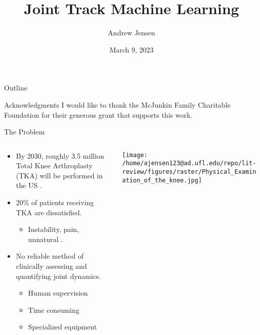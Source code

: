 \documentclass[presentation, aspectratio=1610]{beamer}
\author{Andrew Jensen}
\date{March 9, 2023}
\title{Joint Track Machine Learning}
\begin{document}
\maketitle
\begin{frame}{Outline}
\tableofcontents
\end{frame}

\begin{frame}[label={sec:org9eecd50},standout]{Acknowledgments}
I would like to thank the McJunkin Family Charitable Foundation for their generous grant that supports this work.
\end{frame}
\begin{frame}[label={sec:org2b7cb7e}]{The Problem}
\begin{columns}
\begin{column}{0.5\columnwidth}
\begin{itemize}
\item By 2030, roughly 3.5 million Total Knee Arthroplasty (TKA) will be performed in the US \autocite{kurtzProjectionsPrimaryRevision2007}.
\item 20\% of patients receiving TKA are dissatisfied.
\begin{itemize}
\item Instability, pain, unnatural \autocites{bakerRolePainFunction2007}[][]{bournePatientSatisfactionTotal2010}[][]{scottPredictingDissatisfactionFollowing2010}.
\end{itemize}
\item No reliable method of clinically assessing and quantifying joint dynamics.
\begin{itemize}
\item Human supervision
\item Time consuming
\item Specialized equipment
\end{itemize}
\end{itemize}
\end{column}
\begin{column}{0.5\columnwidth}
\begin{center}
\texttt{[image: /home/ajensen123@ad.ufl.edu/repo/lit-review/figures/raster/Physical\_Examination\_of\_the\_knee.jpg]}
\end{center}
\end{column}
\end{columns}
\end{frame}
\end{document}
